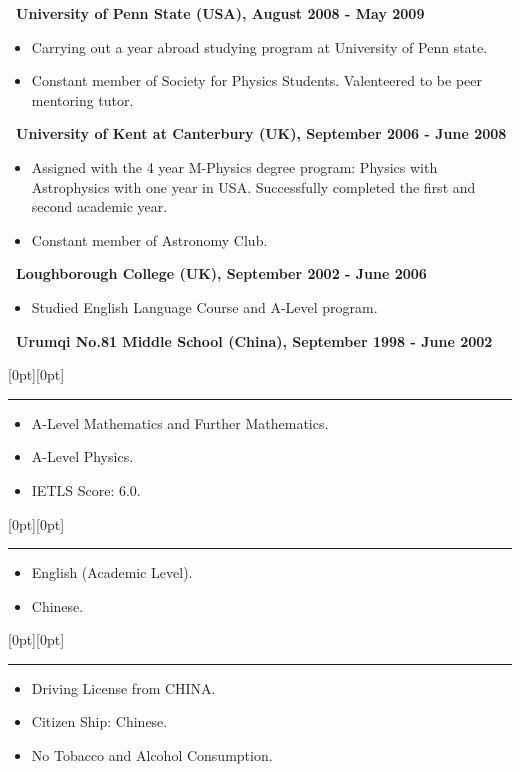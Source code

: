 \documentclass[a4paper,12pt]{letter}
\begin{document}
\textbf{\normalsize ~University of Penn State (USA), August 2008 - May 2009}

\begin{itemize}
\item \textrm{\normalsize Carrying out a year abroad studying program at University of Penn state.}
\item \textrm{\normalsize Constant member of Society for Physics Students. Valenteered to be peer mentoring tutor.}
\end{itemize}

\textbf{\normalsize ~University of Kent at Canterbury (UK), September 2006 - June 2008}
\begin{itemize}
\item \textrm{\normalsize Assigned with the 4 year M-Physics degree program: Physics with Astrophysics with one year in USA. Successfully completed the first and second academic year.}
\item \textrm{\normalsize Constant member of Astronomy Club.}
\end{itemize}

\textbf{\normalsize ~Loughborough College (UK), September 2002 - June 2006}
\begin{itemize}
\item \textrm{\normalsize Studied English Language Course and A-Level program.}
\end{itemize}

\textbf{\normalsize ~Urumqi No.81 Middle School (China), September 1998 - June 2002} 


\raisebox{0pt}[0pt][0pt]{\Large\textbf{\raisebox{-3.5ex}{Qualification}}} 

\rule[-0.5cm]{10cm}{1pt}
\begin{itemize}
\item \textrm{\normalsize A-Level Mathematics and Further Mathematics.}
\item \textrm{\normalsize A-Level Physics.}
\item \textrm{\normalsize IETLS Score: 6.0.}
\end{itemize}
\vspace{5cm}

\raisebox{0pt}[0pt][0pt]{\Large\textbf{\raisebox{-3.5ex}{Language Skill}}} 

\rule[-0.5cm]{10cm}{1pt}
\begin{itemize}
\item \textrm{\normalsize English (Academic Level).}
\item \textrm{\normalsize Chinese.}
\end{itemize}

\raisebox{0pt}[0pt][0pt]{\Large\textbf{\raisebox{-3.5ex}{Additional Information}}} 

\rule[-0.5cm]{10cm}{1pt}
\begin{itemize}
\item \textrm{\normalsize Driving License from CHINA.}
\item \textrm{\normalsize Citizen Ship: Chinese.}
\item \textrm{\normalsize No Tobacco and Alcohol Consumption.}
\end{itemize}
\vspace{0.5cm}
\end{document}
